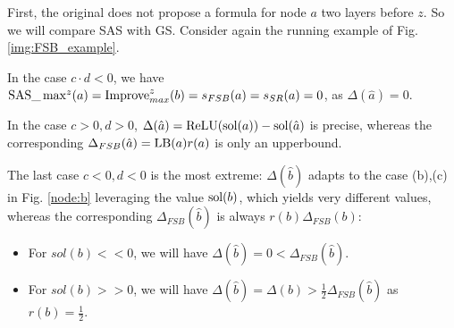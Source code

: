 %	
%	
%	
%	




 First, the original \cite{DivideAndSlide} does not propose a formula for node $a$ two layers before $z$. So we will compare {\sf SAS} with {\sf GS}.
Consider again the running example of Fig. \ref{img:FSB_example}. 

In the case $c\cdot d<0$, we have $\mathrm{SAS}\_\max\nolimits^z(a)=\mathrm{Improve}_{max}^z(b)=s_{FSB}(a)=s_{SR}(a)=0$, as $\Delta(\hat{a})=0$. 

In the case $c>0,d>0$, 
$\Delta(\hat{a}) = \mathrm{ReLU}(\mathrm{sol}(a))-\mathrm{sol}(\hat{a})$ is precise,
whereas the corresponding $\Delta_{FSB}(\hat{a}) = \mathrm{LB}(a) r(a)$ is only an upperbound.

The last case $c<0,d<0$ is the most extreme: 
$\Delta(\hat{b})$ adapts to the case (b),(c) in Fig. \ref{node:b} leveraging the value $\mathrm{sol}(b)$, which yields very different values, whereas the corresponding $\Delta_{FSB}(\hat{b})$
is always $r(b) \Delta_{FSB}(b)$: 
\begin{itemize}
\item For $sol(b)<<0$, we will have 
$\Delta(\hat{b})=0<\Delta_{FSB}(\hat{b})$.
\item For $sol(b)>>0$, we will have 
$\Delta(\hat{b})=\Delta(b) > \frac{1}{2}\Delta_{FSB}(\hat{b})$ 
as $r(b)=\frac{1}{2}$.
\end{itemize}

